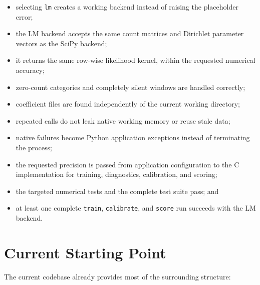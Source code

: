 \documentclass[11pt,a4paper]{article}
\begin{document}
\begin{itemize}

\item selecting \texttt{lm} creates a working backend instead of raising the
placeholder error;

\item the LM backend accepts the same count matrices and Dirichlet parameter
vectors as the SciPy backend;

\item it returns the same row-wise likelihood kernel, within the requested
numerical accuracy;

\item zero-count categories and completely silent windows are handled
correctly;

\item coefficient files are found independently of the current working
directory;

\item repeated calls do not leak native working memory or reuse stale data;

\item native failures become Python application exceptions instead of
terminating the process;

\item the requested precision is passed from application configuration to the
C implementation for training, diagnostics, calibration, and scoring;

\item the targeted numerical tests and the complete test suite pass; and

\item at least one complete \texttt{train}, \texttt{calibrate}, and
\texttt{score} run succeeds with the LM backend.

\end{itemize}

\section{Current Starting Point}

The current codebase already provides most of the surrounding structure:
\end{document}
